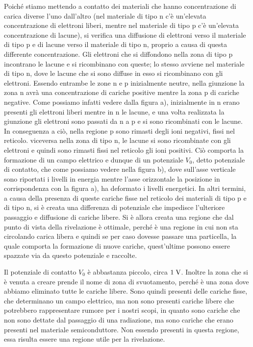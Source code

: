 Poiché stiamo mettendo a contatto dei materiali che hanno concentrazione di carica diverse l'uno dall'altro (nel materiale di tipo n c'è un'elevata concentrazione di elettroni liberi, mentre nel materiale di tipo p c'è un'elevata concentrazione di lacune), si verifica una diffusione di elettroni verso il materiale di tipo p e di lacune verso il materiale di tipo n, proprio a causa di questa differente concentrazione. Gli elettroni che si diffondono nella zona di tipo p incontrano le lacune e si ricombinano con queste; lo stesso avviene nel materiale di tipo n, dove le lacune che si sono diffuse in esso si ricombinano con gli elettroni. Essendo entrambe le zone n e p inizialmente neutre, nella giunzione la zona n avrà una concentrazione di cariche positive mentre la zona p di cariche negative. Come possiamo infatti vedere dalla figura a), inizialmente in n erano presenti gli elettroni liberi mentre in n le lacune, e una volta realizzata la giunzione gli elettroni sono passati da n a p e si sono ricombinati con le lacune. In conseguenza a ciò, nella regione p sono rimasti degli ioni negativi, fissi nel reticolo. viceversa nella zona di tipo n, le lacune si sono ricombinate con gli elettroni e quindi sono rimasti fissi nel reticolo gli ioni positivi. Ciò comporta la formazione di un campo elettrico e dunque di un potenziale $V_0$, detto potenziale di contatto, che come possiamo vedere nella figura b), dove sull'asse verticale sono riportati i livelli in energia mentre l'asse orizzontale la posizione in corrispondenza con la figura a), ha deformato i livelli energetici. In altri termini, a causa della presenza di queste cariche fisse nel reticolo dei materiali di tipo p e di tipo n, si è creata una differenza di potenziale che impedisce l'ulteriore passaggio e diffusione di cariche libere. Si è allora creata una regione che dal punto di vista della rivelazione è ottimale, perché è una regione in cui non sta circolando carica libera e quindi se per caso dovesse passare una particella, la quale comporta la formazione di nuove cariche, quest'ultime possono essere spazzate via da questo potenziale e raccolte.

Il potenziale di contatto $V_0$ è abbastanza piccolo, circa $1 \; \rm V$. Inoltre la zona che si è venuta a creare prende il nome di zona di svuotamento, perché è una zona dove abbiamo eliminato tutte le cariche libere. Sono quindi presenti delle cariche fisse, che determinano un campo elettrico, ma non sono presenti cariche libere che potrebbero rappresentare rumore per i nostri scopi, in quanto sono cariche che non sono dettate dal passaggio di una radiazione, ma sono cariche che erano presenti nel materiale semiconduttore. Non essendo presenti in questa regione, essa risulta essere una regione utile per la rivelazione.

